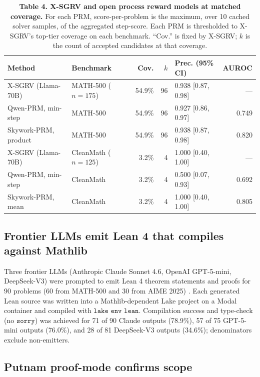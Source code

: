 \documentclass[11pt]{article}
\begin{document}
\begin{table}[h]
\centering
\caption{\textbf{Table 4. X-SGRV and open process reward models at matched coverage.} For each PRM, score-per-problem is the maximum, over 10 cached solver samples, of the aggregated step-score. Each PRM is thresholded to X-SGRV's top-tier coverage on each benchmark. ``Cov.'' is fixed by X-SGRV; $k$ is the count of accepted candidates at that coverage.}
\label{tab:prm}
\small
\begin{tabular}{llrrlr}
\toprule
Method & Benchmark & Cov. & $k$ & Prec. (95\% CI) & AUROC \\
\midrule
X-SGRV (Llama-70B) & MATH-500 ($n{=}175$) & 54.9\% & 96 & 0.938 [0.87, 0.98] & --- \\
Qwen-PRM, min-step & MATH-500 & 54.9\% & 96 & 0.927 [0.86, 0.97] & 0.749 \\
Skywork-PRM, product & MATH-500 & 54.9\% & 96 & 0.938 [0.87, 0.98] & 0.820 \\
\midrule
X-SGRV (Llama-70B) & CleanMath ($n{=}125$) & 3.2\% & 4 & 1.000 [0.40, 1.00] & --- \\
Qwen-PRM, min-step & CleanMath & 3.2\% & 4 & 0.500 [0.07, 0.93] & 0.692 \\
Skywork-PRM, mean & CleanMath & 3.2\% & 4 & 1.000 [0.40, 1.00] & 0.805 \\
\bottomrule
\end{tabular}
\end{table}

\subsection{Frontier LLMs emit Lean 4 that compiles against Mathlib}

Three frontier LLMs (Anthropic Claude Sonnet 4.6, OpenAI GPT-5-mini, DeepSeek-V3) were prompted to emit Lean 4 theorem statements and proofs for 90 problems (60 from MATH-500 and 30 from AIME 2025) \citep{hermes2025}. Each generated Lean source was written into a Mathlib-dependent Lake project on a Modal container and compiled with $\texttt{lake env lean}$. Compilation success and type-check (no $\texttt{sorry}$) was achieved for 71 of 90 Claude outputs (78.9\%), 57 of 75 GPT-5-mini outputs (76.0\%), and 28 of 81 DeepSeek-V3 outputs (34.6\%); denominators exclude non-emitters.

\subsection{Putnam proof-mode confirms scope}
\end{document}
